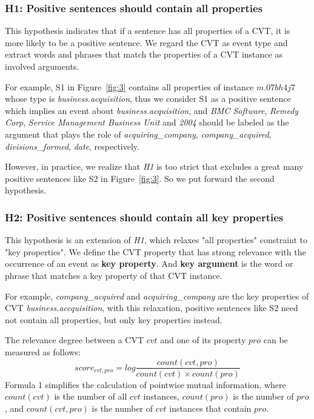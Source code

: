 \documentclass{article}
\begin{document}
\subsubsection{H1: Positive sentences should contain all properties}
This hypothesis indicates that if a sentence has all properties of a CVT, it is more likely to be a positive sentence. We regard the CVT as event type and extract words and phrases that match the properties of a CVT instance as involved arguments. 

For example, S1 in Figure~\ref{fig:3} contains all properties of instance $m.07bh4j7$ whose type is \emph{business.acquisition}, thus we consider S1 as a positive sentence which implies an event about \emph{business.acquisition}, and \emph{BMC Software}, \emph{Remedy Corp}, \emph{Service Management Business Unit} and \emph{2004} should be labeled as the argument that plays the role of \emph{acquiring\_company}, \emph{company\_acquired}, \emph{divisions\_formed}, \emph{date}, respectively.

However, in practice, we realize that \emph{H1} is too strict that excludes a great many positive sentences like S2 in Figure~\ref{fig:3}. So we put forward the second hypothesis.

\subsubsection{H2: Positive sentences should contain all key properties}
This hypothesis is an extension of \emph{H1}, which relaxes "all properties" constraint to "key properties". We define the CVT property that has strong relevance with the occurrence of an event as \textbf{key property}. And \textbf{key argument} is the word or phrase that matches a key property of that CVT instance. 

For example, \emph{company\_acquired} and \emph{acquiring\_company} are the key properties of CVT \emph{business.accquisition}, with this relaxation, positive sentences like S2 need not contain all properties, but only key properties instead.

The relevance degree between a CVT $cvt$ and one of its property $pro$ can be measured as follows:
\begin{equation}
	score_{cvt, pro} = log \frac{count(cvt, pro)}{count(cvt) \times count(pro)} 
\end{equation}
Formula 1 simplifies the calculation of pointwise mutual information, where $count(cvt)$ is the number of all $cvt$ instances, $count(pro)$ is the number of $pro$, and $count(cvt, pro)$ is the number of $cvt$ instances that contain $pro$.
\end{document}
